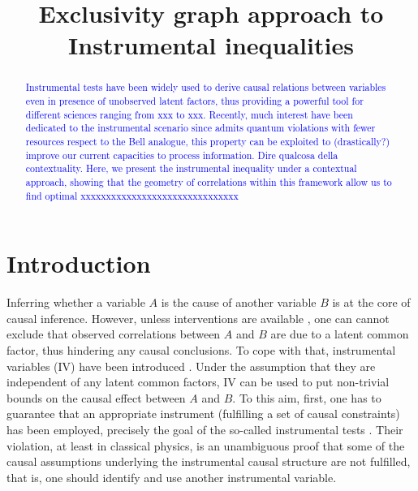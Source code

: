 \documentclass[letterpaper]{article}
\title{Exclusivity graph approach to Instrumental inequalities}
\author{} %
\begin{document}
\maketitle

\begin{abstract}
\textcolor{blue}{Instrumental tests have been widely used to derive causal
   relations between variables even in presence of unobserved latent factors,
   thus providing a powerful tool for different sciences ranging from xxx to
   xxx. Recently, much interest have been dedicated to the instrumental scenario
   since admits quantum violations with fewer resources respect to the Bell
   analogue, this property can be exploited to (drastically?) improve our
   current capacities to process information. Dire qualcosa della contextuality.
   Here, we present the instrumental inequality under a contextual approach,
   showing that the geometry of correlations within this framework allow us to
   find optimal xxxxxxxxxxxxxxxxxxxxxxxxxxxxxxx  }  
\end{abstract}

\section*{Introduction}
Inferring  whether a variable $A$ is the cause of another variable $B$ is at the
core of causal inference. However, unless interventions are available
\cite{pearlbook}, one can cannot exclude that observed correlations between $A$
and $B$ are due to a latent common factor, thus hindering any causal
conclusions. To cope with that, instrumental variables (IV) have been introduced
\cite{pearl1995, bonet2001}. Under the assumption that they are independent of
any latent common factors, IV can be used to put non-trivial bounds on the
causal effect between $A$ and $B$. To this aim, first, one has to guarantee that
an appropriate instrument (fulfilling a set of causal constraints) has been
employed, precisely the goal of the so-called instrumental tests
\cite{pearl1995, bonet2001}. Their violation, at least in classical physics, is
an unambiguous proof that some of the causal assumptions underlying the
instrumental causal structure are not fulfilled, that is, one should identify
and use another instrumental variable.
\end{document}
